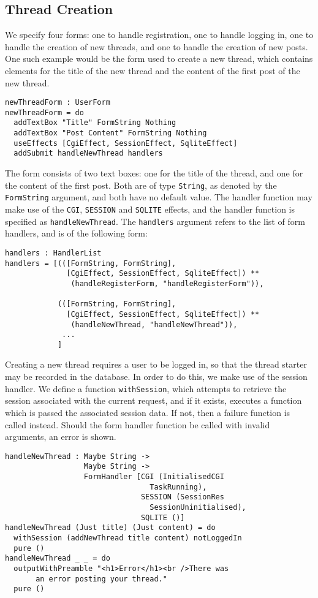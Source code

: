 \documentclass[preprint]{sigplanconf}
\begin{document}
\subsection{Thread Creation}
We specify four forms: one to handle registration, one to handle logging in, one to handle the creation of new threads, and one to handle the creation of new posts. One such example would be the form used to create a new thread, which contains elements for the title of the new thread and the content of the first post of the new thread.

{\small
\begin{verbatim}
newThreadForm : UserForm
newThreadForm = do
  addTextBox "Title" FormString Nothing
  addTextBox "Post Content" FormString Nothing 
  useEffects [CgiEffect, SessionEffect, SqliteEffect]
  addSubmit handleNewThread handlers
\end{verbatim}
}
The form consists of two text boxes: one for the title of the thread, and one for the content of the first post. Both are of type \texttt{String}, as denoted by the \texttt{FormString} argument, and both have no default value. The handler function may make use of the \texttt{CGI}, \texttt{SESSION} and \texttt{SQLITE} effects, and the handler function is specified as \texttt{handleNewThread}. The \texttt{handlers} argument refers to the list of form handlers, and is of the following form:
{\small
\begin{verbatim}
handlers : HandlerList
handlers = [(([FormString, FormString], 
              [CgiEffect, SessionEffect, SqliteEffect]) ** 
               (handleRegisterForm, "handleRegisterForm")),
               
            (([FormString, FormString], 
              [CgiEffect, SessionEffect, SqliteEffect]) ** 
               (handleNewThread, "handleNewThread")),
             ...
            ]
\end{verbatim}
}
Creating a new thread requires a user to be logged in, so that the thread starter may be recorded in the database. In order to do this, we make use of the session handler. We define a function \texttt{withSession}, which attempts to retrieve the session associated with the current request, and if it exists, executes a function which is passed the associated session data. If not, then a failure function is called instead. Should the form handler function be called with invalid arguments, an error is shown.
{\small
\begin{verbatim}
handleNewThread : Maybe String -> 
                  Maybe String -> 
                  FormHandler [CGI (InitialisedCGI 
                                 TaskRunning), 
                               SESSION (SessionRes 
                                 SessionUninitialised), 
                               SQLITE ()]  
handleNewThread (Just title) (Just content) = do 
  withSession (addNewThread title content) notLoggedIn
  pure ()
handleNewThread _ _ = do 
  outputWithPreamble "<h1>Error</h1><br />There was 
       an error posting your thread."
  pure ()
\end{verbatim}
}
\end{document}
